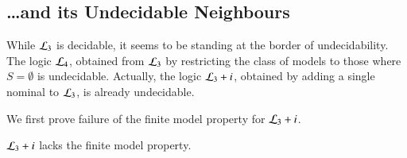 
\subsection{\ldots and its Undecidable Neighbours}

While $\mathcal{L}_3$ is decidable, it seems to be standing at the border
of undecidability.  The logic $\mathcal{L}_4$, obtained from $\mathcal{L}_3$ by
restricting the class of models to those where $S=\emptyset$ is
undecidable.  Actually, the logic $\mathcal{L}_3+i$, obtained by adding
a single nominal to $\mathcal{L}_3$, is already undecidable.

We first prove failure of the finite model property for $\mathcal{L}_3 + i$.

\begin{thm}\label{thm:tlmi:inf}
$\mathcal{L}_3 + i$ lacks the finite model property.
\end{thm}

